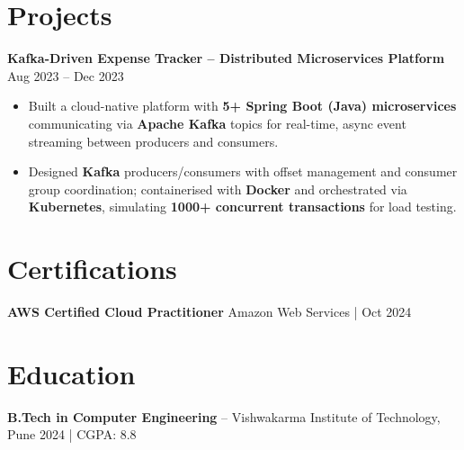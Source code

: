 \documentclass[letterpaper,10pt]{article}
\begin{document}
\section*{Projects}

\textbf{Kafka-Driven Expense Tracker -- Distributed Microservices Platform} \hfill Aug 2023 -- Dec 2023
\begin{itemize}[leftmargin=*]
    \item Built a cloud-native platform with \textbf{5+ Spring Boot (Java) microservices} communicating via \textbf{Apache Kafka} topics for real-time, async event streaming between producers and consumers.
    \item Designed \textbf{Kafka} producers/consumers with offset management and consumer group coordination; containerised with \textbf{Docker} and orchestrated via \textbf{Kubernetes}, simulating \textbf{1000+ concurrent transactions} for load testing.
\end{itemize}

\section*{Certifications}
\textbf{AWS Certified Cloud Practitioner} \hfill Amazon Web Services \;|\; Oct 2024

\section*{Education}
\textbf{B.Tech in Computer Engineering} -- Vishwakarma Institute of Technology, Pune \hfill 2024 \;|\; CGPA: 8.8
\end{document}
